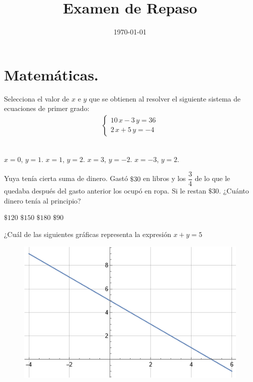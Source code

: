 \documentclass[14pt]{exam}
\title{\vspace*{-2cm}Examen de Repaso\vspace{-5ex}}
\date{\today}
\begin{document}
\maketitle

\section{Matemáticas.}

\begin{questions}

\question Selecciona el valor de $x$ e $y$ que se obtienen al resolver el siguiente sistema de ecuaciones de primer grado:
\begin{align*}
\begin{cases}
10 \, x - 3 \, y = 36 \\
2 \, x + 5 \, y = -4
\end{cases}
\end{align*}
\\[0.5em]
\begin{oneparchoices}
    \choice $x = 0$, $y = 1$. 
    \choice $x = 1$, $y = 2$. 
    \choice $x = 3$, $y = -2$. 
    \choice $x = -3$, $y = 2$. 
\end{oneparchoices}
\question Yuya tenía cierta suma de dinero. Gastó $\$30$ en libros y los $\dfrac{3}{4}$ de lo que le quedaba después del gasto anterior los ocupó en ropa. Si le restan $\$30$. ¿Cuánto dinero tenía al principio?
\\[0.5em]
\begin{oneparchoices}
    \choice $\$120$
    \choice $\$150$
    \choice $\$180$
    \choice $\$90$
\end{oneparchoices}
\question ¿Cuál de las siguientes gráficas representa la expresión $x + y = 5$
\\[0.5em]
\begin{minipage}{0.4\linewidth}
\begin{figure}[H]
    \includegraphics[scale=0.5]{Imagenes/Examen_Repaso_2023_03_07_01.png}

\end{figure}
\end{minipage}
\end{questions}
\end{document}
